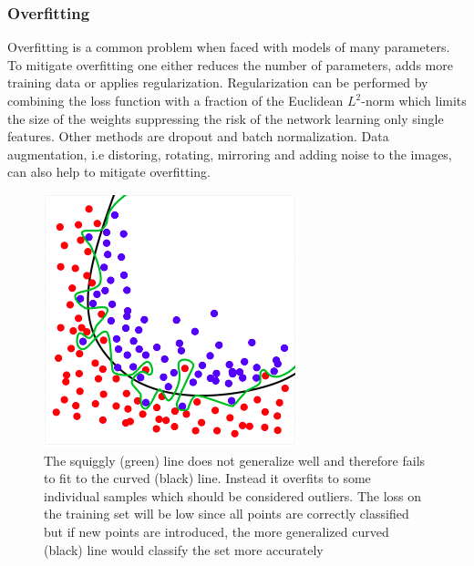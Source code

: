         \subsubsection{Overfitting}
            Overfitting is a common problem when faced with models of many parameters. To mitigate overfitting one either reduces the 
            number of parameters, adds more training data or applies  regularization. Regularization can be performed by combining the 
            loss function with a fraction of the Euclidean $L^2$-norm which limits the size of the weights suppressing the risk of the 
            network learning only single features. Other methods are dropout and batch normalization. Data augmentation, i.e distoring, 
            rotating, mirroring and adding noise to the images, can also help to mitigate overfitting.
            \begin{figure}[H]
                \centering
                \includegraphics[width=0.6\linewidth]{img/overfitting.png}
                \caption{The squiggly (green) line does not generalize well and therefore fails to fit to the curved (black)
                line. Instead it overfits to some individual samples which should be considered outliers. The loss on the training set 
                will be low since all points are correctly classified but if new points are introduced, the more generalized curved (black) 
                line would classify the set more accurately}
            \end{figure}
